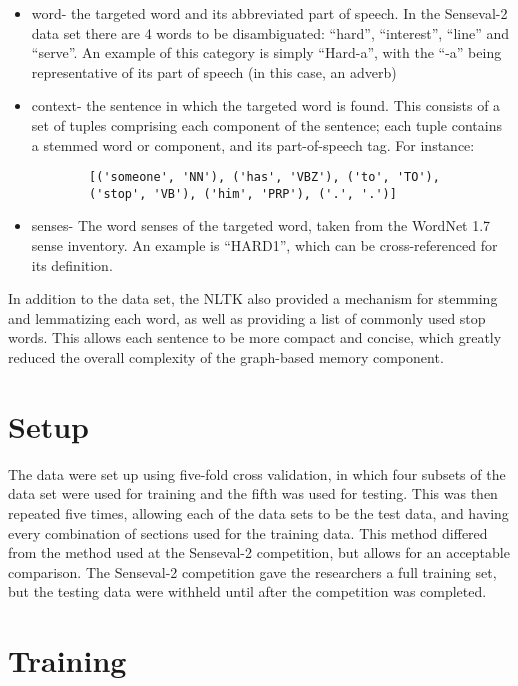 \begin{itemize}     
	\item word- the targeted word and its abbreviated part of speech. In the 
	Senseval-2 data set there are 4 words to be disambiguated: ``hard'', 
	``interest'', ``line'' and ``serve''. An example of this category is simply
	``Hard-a'', with the ``-a'' being representative of its part of speech (in 
	this case, an adverb)
	\item context- the sentence in which the targeted word is found. This consists of 
	a set of tuples comprising each component of the sentence; each tuple 
	contains a stemmed word or component, and its part-of-speech tag. For 
	instance: 
	\begin{verbatim}
		[('someone', 'NN'), ('has', 'VBZ'), ('to', 'TO'), 
		('stop', 'VB'), ('him', 'PRP'), ('.', '.')] 
	\end{verbatim}

	\item senses- The word senses of the targeted word, taken from the WordNet 
	1.7 sense inventory. An example is ``HARD1'', which can be cross-referenced 
	for its definition. 
\end{itemize}

In addition to the data set, the NLTK also provided a mechanism for stemming and
lemmatizing each word, as well as providing a list of commonly used stop words.
This allows each sentence to be more compact and concise, which greatly reduced
the overall complexity of the graph-based memory component.

\section{Setup}

The data were set up using five-fold cross validation, in which four subsets of
the data set were used for training and the fifth was used for testing. This
was then repeated five times, allowing each of the data sets to be the test
data, and having every combination of sections used for the training data.  This method
differed from the method used at the Senseval-2 competition, but allows for an
acceptable comparison.  The Senseval-2 competition gave the researchers a full
training set, but the testing data were withheld until after the competition was completed.   

\section{Training}

